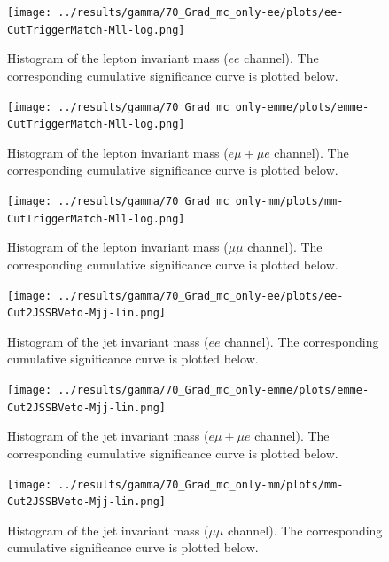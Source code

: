 \begin{figure}
	\centering
		\texttt{[image: ../results/gamma/70\_Grad\_mc\_only-ee/plots/ee-CutTriggerMatch-Mll-log.png]}
		\caption{Histogram of the lepton invariant mass ($ee$ channel). The corresponding cumulative significance curve is plotted below.}
		\label{ee_mll}
\end{figure}
\begin{figure}
	\centering
		\texttt{[image: ../results/gamma/70\_Grad\_mc\_only-emme/plots/emme-CutTriggerMatch-Mll-log.png]}
		\caption{Histogram of the lepton invariant mass ($e \mu + \mu e$ channel). The corresponding cumulative significance curve is plotted below.}
		\label{emme_mll}
\end{figure}
\begin{figure}
	\centering
		\texttt{[image: ../results/gamma/70\_Grad\_mc\_only-mm/plots/mm-CutTriggerMatch-Mll-log.png]}
		\caption{Histogram of the lepton invariant mass ($\mu\mu$ channel). The corresponding cumulative significance curve is plotted below.}
		\label{mm_mll}
\end{figure}

\begin{figure}
	\centering
		\texttt{[image: ../results/gamma/70\_Grad\_mc\_only-ee/plots/ee-Cut2JSSBVeto-Mjj-lin.png]}
		\caption{Histogram of the jet invariant mass ($ee$ channel). The corresponding cumulative significance curve is plotted below.}
		\label{ee_mjj}
\end{figure}
\begin{figure}
	\centering
		\texttt{[image: ../results/gamma/70\_Grad\_mc\_only-emme/plots/emme-Cut2JSSBVeto-Mjj-lin.png]}
		\caption{Histogram of the jet invariant mass ($e \mu + \mu e$ channel). The corresponding cumulative significance curve is plotted below.}
		\label{emme_mjj}
\end{figure}
\begin{figure}
	\centering
		\texttt{[image: ../results/gamma/70\_Grad\_mc\_only-mm/plots/mm-Cut2JSSBVeto-Mjj-lin.png]}
		\caption{Histogram of the jet invariant mass ($\mu\mu$ channel). The corresponding cumulative significance curve is plotted below.}
		\label{mm_mjj}
\end{figure}

